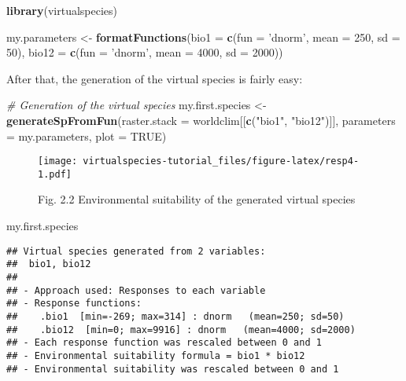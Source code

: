 \documentclass[]{article}
\newenvironment{Shaded}{\begin{snugshade}}{\end{snugshade}}
\newcommand{\KeywordTok}[1]{\textcolor[rgb]{0.13,0.29,0.53}{\textbf{#1}}}
\newcommand{\DataTypeTok}[1]{\textcolor[rgb]{0.13,0.29,0.53}{#1}}
\newcommand{\DecValTok}[1]{\textcolor[rgb]{0.00,0.00,0.81}{#1}}
\newcommand{\StringTok}[1]{\textcolor[rgb]{0.31,0.60,0.02}{#1}}
\newcommand{\CommentTok}[1]{\textcolor[rgb]{0.56,0.35,0.01}{\textit{#1}}}
\newcommand{\OtherTok}[1]{\textcolor[rgb]{0.56,0.35,0.01}{#1}}
\newcommand{\NormalTok}[1]{#1}
\begin{document}
\begin{Shaded}
\begin{Highlighting}[]
\KeywordTok{library}\NormalTok{(virtualspecies)}

\NormalTok{my.parameters <-}\StringTok{ }\KeywordTok{formatFunctions}\NormalTok{(}\DataTypeTok{bio1 =} \KeywordTok{c}\NormalTok{(}\DataTypeTok{fun =} \StringTok{'dnorm'}\NormalTok{, }\DataTypeTok{mean =} \DecValTok{250}\NormalTok{, }\DataTypeTok{sd =} \DecValTok{50}\NormalTok{),}
                                 \DataTypeTok{bio12 =} \KeywordTok{c}\NormalTok{(}\DataTypeTok{fun =} \StringTok{'dnorm'}\NormalTok{, }\DataTypeTok{mean =} \DecValTok{4000}\NormalTok{, }\DataTypeTok{sd =} \DecValTok{2000}\NormalTok{))}
\end{Highlighting}
\end{Shaded}

After that, the generation of the virtual species is fairly easy:

\begin{Shaded}
\begin{Highlighting}[]
\CommentTok{# Generation of the virtual species}
\NormalTok{my.first.species <-}\StringTok{ }\KeywordTok{generateSpFromFun}\NormalTok{(}\DataTypeTok{raster.stack =}\NormalTok{ worldclim[[}\KeywordTok{c}\NormalTok{(}\StringTok{"bio1"}\NormalTok{, }\StringTok{"bio12"}\NormalTok{)]],}
                                              \DataTypeTok{parameters =}\NormalTok{ my.parameters,}
                                              \DataTypeTok{plot =} \OtherTok{TRUE}\NormalTok{)}
\end{Highlighting}
\end{Shaded}

\begin{figure}
\centering
\texttt{[image: virtualspecies-tutorial\_files/figure-latex/resp4-1.pdf]}
\caption{Fig. 2.2 Environmental suitability of the generated virtual
species}
\end{figure}

\begin{Shaded}
\begin{Highlighting}[]
\NormalTok{my.first.species}
\end{Highlighting}
\end{Shaded}

\begin{verbatim}
## Virtual species generated from 2 variables:
##  bio1, bio12
## 
## - Approach used: Responses to each variable
## - Response functions:
##    .bio1  [min=-269; max=314] : dnorm   (mean=250; sd=50)
##    .bio12  [min=0; max=9916] : dnorm   (mean=4000; sd=2000)
## - Each response function was rescaled between 0 and 1
## - Environmental suitability formula = bio1 * bio12
## - Environmental suitability was rescaled between 0 and 1
\end{verbatim}
\end{document}
